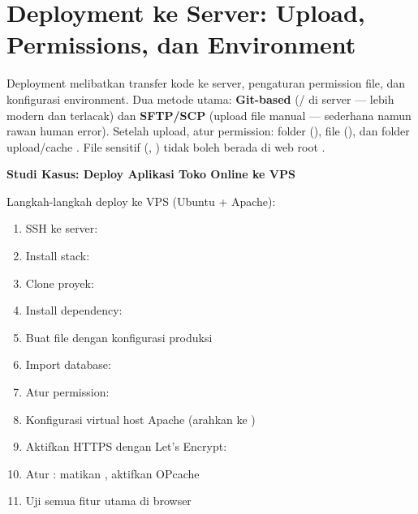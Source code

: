 \section{Deployment ke Server: Upload, Permissions, dan Environment}

Deployment melibatkan transfer kode ke server, pengaturan permission file, dan konfigurasi environment. Dua metode utama: \textbf{Git-based} (/ di server --- lebih modern dan terlacak) dan \textbf{SFTP/SCP} (upload file manual --- sederhana namun rawan human error). Setelah upload, atur permission: folder  (), file  (), dan folder upload/cache . File sensitif (, ) tidak boleh berada di web root \cite{mdnDeploy}.

\begin{contoh}
\textbf{Studi Kasus: Deploy Aplikasi Toko Online ke VPS}

Langkah-langkah deploy ke VPS (Ubuntu + Apache):
\begin{enumerate}
  \item SSH ke server: 
  \item Install stack: 
  \item Clone proyek: 
  \item Install dependency: 
  \item Buat file  dengan konfigurasi produksi
  \item Import database: 
  \item Atur permission: 
  \item Konfigurasi virtual host Apache (arahkan ke )
  \item Aktifkan HTTPS dengan Let's Encrypt: 
  \item Atur : matikan , aktifkan OPcache
  \item Uji semua fitur utama di browser
\end{enumerate}
\end{contoh}

